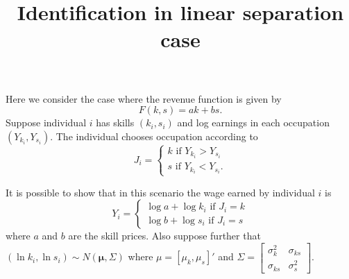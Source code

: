 \documentclass{article}
\title{Identification in linear separation case}
\author{}
\date{}
\begin{document}
	\vspace{-1.5cm}
	\maketitle
	\vspace{-1.75cm}
	
	Here we consider the case where the revenue function is given by
	\begin{equation*}
		F(k,s) = ak + bs.
	\end{equation*}
	Suppose individual $i$ has skills $(k_i,s_i)$ and log earnings in each occupation $(Y_{k_i},Y_{s_i})$. The individual chooses occupation according to
	\begin{equation*}
	 J_i =	\begin{cases}
		k \text{  if  } Y_{k_i} > Y_{s_i}\\
		s \text{  if  } Y_{k_i} < Y_{s_i}.
		\end{cases}
	\end{equation*}
	
	
	It is possible to show that in this scenario the wage earned by individual $i$ is
	\begin{equation*}
		Y_i =
		\begin{cases}
			\log a + \log k_i \text{ if } J_i = k \\
			\log b + \log s_i \text{ if } J_i = s
		\end{cases}
	\end{equation*}
	where $a$ and $b$ are the skill prices. Also suppose further that $(\ln k_i, \ln s_i) \sim N(\mathbf{\mu},\Sigma)$ where $\mu = [\mu_k,\mu_s]'$ and $\Sigma=\begin{bmatrix}
		\sigma_k^2 & \sigma_{ks} \\
		\sigma_{ks} & \sigma_s^2
	\end{bmatrix}$. 
	
\end{document}
